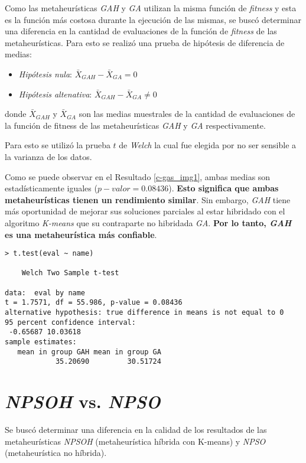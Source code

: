	Como las metaheurísticas \emph{GAH} y \emph{GA} utilizan la misma función de
\emph{fitness} y esta es la función más costosa durante la ejecución de las mismas,
se buscó determinar una diferencia en la cantidad de evaluaciones de la función
de \emph{fitness} de las metaheurísticas. Para esto se realizó una prueba de
hipótesis de diferencia de medias:
\begin{itemize}
    \item \emph{Hipótesis nula}: $\bar{X}_{GAH} - \bar{X}_{GA} = 0$
    \item \emph{Hipótesis altenativa}: $\bar{X}_{GAH} - \bar{X}_{GA} \neq 0$
\end{itemize}
donde $\bar{X}_{GAH}$ y $\bar{X}_{GA}$ son las medias muestrales de la cantidad
de evaluaciones de la función de fitness de las metaheurísticas \emph{GAH} y
\emph{GA} respectivamente.

    Para esto se utilizó la prueba $t$ de \emph{Welch} \cite{AB_0} la cual fue
elegida por no ser sensible a la varianza de los datos.

	Como se puede observar en el Resultado \ref{c-gas_img1}, ambas medias son
estadísticamente iguales ($p-valor = 0.08436$). {\bf Esto significa que ambas
metaheurísticas tienen un rendimiento similar}. Sin embargo, \emph{GAH} tiene
más oportunidad de mejorar sus soluciones parciales al estar hibridado con el
algoritmo \emph{K-means} que su contraparte no hibridada \emph{GA}. {\bf Por lo
tanto, \emph{GAH} es una metaheurística más confiable}.

\begin{lstlisting}[float=h!, caption={Diferencia de medias: Cantidad de Evaluaciones}, label=c-gas_img1]
> t.test(eval ~ name)

	Welch Two Sample t-test

data:  eval by name 
t = 1.7571, df = 55.986, p-value = 0.08436
alternative hypothesis: true difference in means is not equal to 0 
95 percent confidence interval:
 -0.65687 10.03618 
sample estimates:
   mean in group GAH mean in group GA
            35.20690         30.51724 
\end{lstlisting}

\section{\emph{NPSOH} vs. \emph{NPSO}}

	Se buscó determinar una diferencia en la calidad de los resultados de las
metaheurísticas \emph{NPSOH} (metaheurística híbrida con K-means) y
\emph{NPSO} (metaheurística no híbrida).

